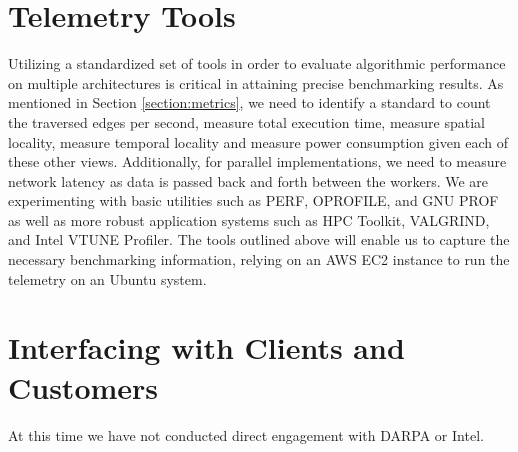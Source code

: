 \documentclass[letterpaper, 10pt]{article}
\begin{document}
\begin{multicols}{2}
    \section{Telemetry Tools}\label{section:telemetry}
        Utilizing a standardized set of tools in order to evaluate algorithmic performance on multiple architectures is critical in attaining precise benchmarking results. As mentioned in Section \ref{section:metrics}, we need to identify a standard to count the traversed edges per second, measure total execution time, measure spatial locality, measure temporal locality and measure power consumption given each of these other views. Additionally, for parallel implementations, we need to measure network latency as data is passed back and forth between the workers. We are experimenting with basic utilities such as PERF, OPROFILE, and GNU PROF as well as more robust application systems such as HPC Toolkit, VALGRIND, and Intel VTUNE Profiler. The tools outlined above will enable us to capture the necessary benchmarking information, relying on an AWS EC2 instance to run the telemetry on an Ubuntu system. \\
       
    \section{Interfacing with Clients and Customers}\label{section:stakeholders}        
        At this time we have not conducted direct engagement with DARPA or Intel.


\end{multicols}
\end{document}
